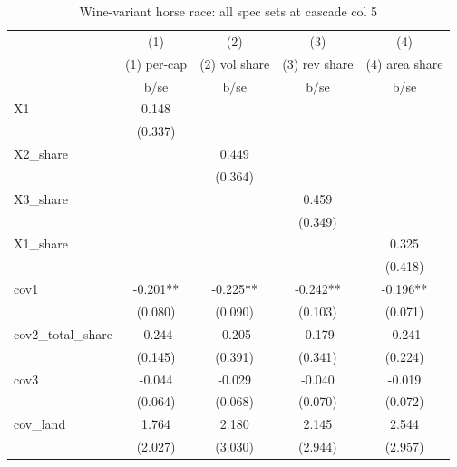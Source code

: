 \begin{table}[htbp]\centering
\def\sym#1{\ifmmode^{#1}\else\(^{#1}\)\fi}
\caption{Wine-variant horse race: all spec sets at cascade col 5 \label{tab:horserace}}
\begin{tabular}{l*{4}{c}}
\toprule
            &\multicolumn{1}{c}{(1)}&\multicolumn{1}{c}{(2)}&\multicolumn{1}{c}{(3)}&\multicolumn{1}{c}{(4)}\\
            &\multicolumn{1}{c}{(1) per-cap}&\multicolumn{1}{c}{(2) vol share}&\multicolumn{1}{c}{(3) rev share}&\multicolumn{1}{c}{(4) area share}\\
            &        b/se   &        b/se   &        b/se   &        b/se   \\
\midrule
X1          &       0.148   &               &               &               \\
            &     (0.337)   &               &               &               \\
X2\_share    &               &       0.449   &               &               \\
            &               &     (0.364)   &               &               \\
X3\_share    &               &               &       0.459   &               \\
            &               &               &     (0.349)   &               \\
X1\_share    &               &               &               &       0.325   \\
            &               &               &               &     (0.418)   \\
cov1        &      -0.201** &      -0.225** &      -0.242** &      -0.196** \\
            &     (0.080)   &     (0.090)   &     (0.103)   &     (0.071)   \\
cov2\_total\_share&      -0.244   &      -0.205   &      -0.179   &      -0.241   \\
            &     (0.145)   &     (0.391)   &     (0.341)   &     (0.224)   \\
cov3        &      -0.044   &      -0.029   &      -0.040   &      -0.019   \\
            &     (0.064)   &     (0.068)   &     (0.070)   &     (0.072)   \\
cov\_land    &       1.764   &       2.180   &       2.145   &       2.544   \\
            &     (2.027)   &     (3.030)   &     (2.944)   &     (2.957)   \\

\end{tabular}
\end{table}
